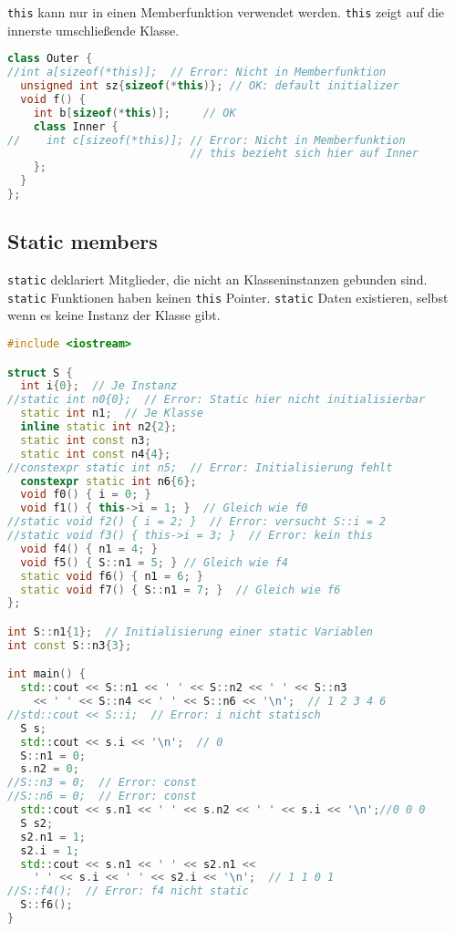\lstinline|this| kann nur in einen Memberfunktion verwendet werden.
\lstinline|this| zeigt auf die innerste umschließende Klasse.

\begin{lstlisting}[language=C++]
class Outer {
//int a[sizeof(*this)];  // Error: Nicht in Memberfunktion
  unsigned int sz{sizeof(*this)}; // OK: default initializer
  void f() {
    int b[sizeof(*this)];     // OK
    class Inner {
//    int c[sizeof(*this)]; // Error: Nicht in Memberfunktion
                            // this bezieht sich hier auf Inner
    };
  }
};
\end{lstlisting}

\subsection{Static members}

\lstinline|static| deklariert Mitglieder, die nicht an Klasseninstanzen gebunden
sind. \lstinline|static| Funktionen haben keinen \lstinline|this| Pointer.
\lstinline|static| Daten existieren, selbst wenn es keine Instanz der Klasse
gibt.

\begin{lstlisting}[language=C++]
#include <iostream>

struct S {
  int i{0};  // Je Instanz
//static int n0{0};  // Error: Static hier nicht initialisierbar
  static int n1;  // Je Klasse
  inline static int n2{2};
  static int const n3;
  static int const n4{4};
//constexpr static int n5;  // Error: Initialisierung fehlt
  constexpr static int n6{6};
  void f0() { i = 0; }
  void f1() { this->i = 1; }  // Gleich wie f0
//static void f2() { i = 2; }  // Error: versucht S::i = 2
//static void f3() { this->i = 3; }  // Error: kein this
  void f4() { n1 = 4; }
  void f5() { S::n1 = 5; } // Gleich wie f4
  static void f6() { n1 = 6; }
  static void f7() { S::n1 = 7; }  // Gleich wie f6
};

int S::n1{1};  // Initialisierung einer static Variablen
int const S::n3{3};

int main() {
  std::cout << S::n1 << ' ' << S::n2 << ' ' << S::n3
    << ' ' << S::n4 << ' ' << S::n6 << '\n';  // 1 2 3 4 6
//std::cout << S::i;  // Error: i nicht statisch
  S s;
  std::cout << s.i << '\n';  // 0
  S::n1 = 0;
  s.n2 = 0;
//S::n3 = 0;  // Error: const
//S::n6 = 0;  // Error: const
  std::cout << s.n1 << ' ' << s.n2 << ' ' << s.i << '\n';//0 0 0
  S s2;
  s2.n1 = 1;
  s2.i = 1;
  std::cout << s.n1 << ' ' << s2.n1 <<
    ' ' << s.i << ' ' << s2.i << '\n';  // 1 1 0 1
//S::f4();  // Error: f4 nicht static
  S::f6();
}
\end{lstlisting}

